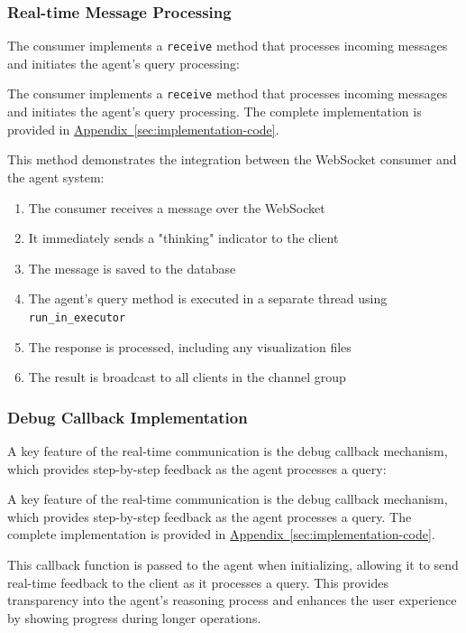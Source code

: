 \subsubsection{Real-time Message Processing}
The consumer implements a \texttt{receive} method that processes incoming messages and initiates the agent's query processing:

The consumer implements a \texttt{receive} method that processes incoming messages and initiates the agent's query processing. The complete implementation is provided in \hyperref[code:real-time-message-processing]{Appendix~\ref{sec:implementation-code}}.

This method demonstrates the integration between the WebSocket consumer and the agent system:

\begin{enumerate}
    \item The consumer receives a message over the WebSocket
    \item It immediately sends a "thinking" indicator to the client
    \item The message is saved to the database
    \item The agent's query method is executed in a separate thread using \texttt{run\_in\_executor}
    \item The response is processed, including any visualization files
    \item The result is broadcast to all clients in the channel group
\end{enumerate}

\subsubsection{Debug Callback Implementation}
A key feature of the real-time communication is the debug callback mechanism, which provides step-by-step feedback as the agent processes a query:

A key feature of the real-time communication is the debug callback mechanism, which provides step-by-step feedback as the agent processes a query. The complete implementation is provided in \hyperref[code:debug-callback]{Appendix~\ref{sec:implementation-code}}.

This callback function is passed to the agent when initializing, allowing it to send real-time feedback to the client as it processes a query. This provides transparency into the agent's reasoning process and enhances the user experience by showing progress during longer operations.

